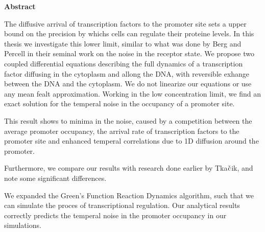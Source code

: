 \begin{center}
{\center \bf Abstract}
\end{center}

The diffusive arrival of transcription factors to the promoter site sets a upper bound on the precision by whichs cells can regulate their proteine levels. In this thesis we investigate this lower limit, similar to what was done by Berg and Percell in their seminal work on the noise in the receptor state. We propose two coupled differential equations describing the full dynamics of a transcription factor diffusing in the cytoplasm and allong the DNA, with reversible exhange between the DNA and the cytoplasm. We do not linearize our equations or use any mean fealt approximation. Working in the low concentration limit, we find an exact solution for the temperal noise in the occupancy of a promoter site.

This result shows to minima in the noise, caused by a competition between the average promoter occupancy, the arrival rate of transcription factors to the promoter site and enhanced temperal correlations due to 1D diffusion around the promoter. 

Furthermore, we compare our results with research done earlier by Tka$\check{\rm c}$ik, and note some significant differences.

We expanded the Green's Function Reaction Dynamics algorithm, such that we can simulate the proces of transcriptional regulation. Our analytical results correctly predicts the temperal noise in the promoter occupancy in our simulations.

